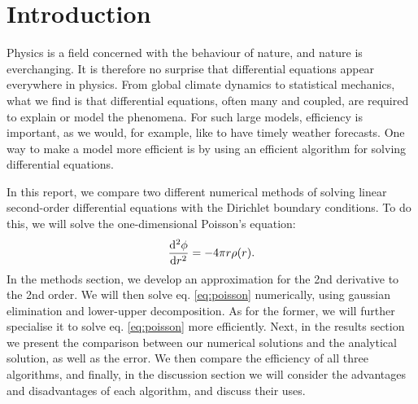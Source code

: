 \section{Introduction}
\label{sec:introduction}

Physics is a field concerned with the behaviour of nature, and nature is
everchanging. It is therefore no surprise that differential equations appear
everywhere in physics. From global climate dynamics to statistical mechanics,
what we find is that differential equations, often many and coupled, are
required to explain or model the phenomena. For such large models, efficiency
is important, as we would, for example, like to have timely weather forecasts.
One way to make a model more efficient is by using an efficient algorithm for
solving differential equations.

In this report, we compare two different numerical methods of solving linear
second-order differential equations with the Dirichlet boundary conditions.
To do this, we will solve the one-dimensional Poisson's equation:
  \begin{equation}
  \label{eq:poisson}
    \dv[2]{\phi}{r} = -4\pi r \rho\qty(r).
  \end{equation}
In the methods section, we develop an approximation for the
2nd derivative to the 2nd order. We will then solve eq. \ref{eq:poisson}
numerically, using gaussian elimination and lower-upper decomposition. As for
the former, we will further specialise it to solve eq. \ref{eq:poisson} more
efficiently. Next, in the results section we present the comparison
between our numerical solutions and the analytical solution, as well as the error.
We then compare the efficiency of all three algorithms, and finally, in the
discussion section we will consider the advantages and disadvantages
of each algorithm, and discuss their uses.
